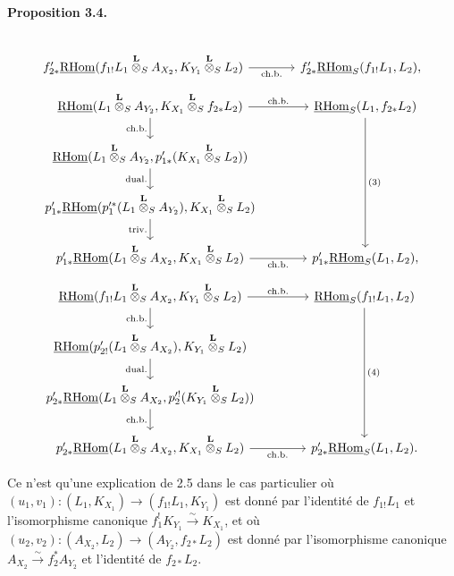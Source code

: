 \documentclass[11pt]{article}
\newenvironment{statement}[1]{\par\medskip\noindent\textbf{#1.}\ }{\par\medskip}
\newcommand{\R}{\mathrm{R}}\newcommand{\RHomCore}{\mathrm{RHom}}
\providecommand{\RHom}{\RHomCore}
\providecommand{\uRHom}{\underline{\RHom}}
\providecommand{\RHom}{\RHomCore}
\providecommand{\RHom}{\R\mathcal{H}om}
\providecommand{\R}{\mathrm R}
\providecommand{\RHom}{\RHomCore}
\begin{document}
\begin{statement}{Proposition 3.4}
\[\begin{tikzcd}[column sep=3.7em,row sep=1.7em]
& \\
f'_{2*}\uRHom(f_{1!}L_1\overset{\mathbf L}{\otimes}_S A_{X_2},K_{Y_1}\overset{\mathbf L}{\otimes}_S L_2) \arrow[r,"\mathrm{ch.b.}"']
& f'_{2*}\uRHom_S(f_{1!}L_1,L_2),
\end{tikzcd}
\]
\[
\begin{tikzcd}[column sep=3.7em,row sep=1.7em]
\uRHom(L_1\overset{\mathbf L}{\otimes}_S A_{Y_2},K_{X_1}\overset{\mathbf L}{\otimes}_S f_{2*}L_2)
  \arrow[r,"\mathrm{ch.b.}"] \arrow[d,"\mathrm{ch.b.}"']
& \uRHom_S(L_1,f_{2*}L_2) \arrow[ddd,"(3)"] \\
\uRHom(L_1\overset{\mathbf L}{\otimes}_S A_{Y_2},p'_{1*}(K_{X_1}\overset{\mathbf L}{\otimes}_S L_2)) \arrow[d,"\mathrm{dual.}"']
& \\
p'_{1*}\uRHom(p_1'^*(L_1\overset{\mathbf L}{\otimes}_S A_{Y_2}),K_{X_1}\overset{\mathbf L}{\otimes}_S L_2) \arrow[d,"\mathrm{triv.}"']
& \\
p'_{1*}\uRHom(L_1\overset{\mathbf L}{\otimes}_S A_{X_2},K_{X_1}\overset{\mathbf L}{\otimes}_S L_2) \arrow[r,"\mathrm{ch.b.}"']
& p'_{1*}\uRHom_S(L_1,L_2),
\end{tikzcd}
\]
\[
\begin{tikzcd}[column sep=3.7em,row sep=1.7em]
\uRHom(f_{1!}L_1\overset{\mathbf L}{\otimes}_S A_{X_2},K_{Y_1}\overset{\mathbf L}{\otimes}_S L_2)
  \arrow[r,"\mathrm{ch.b.}"] \arrow[d,"\mathrm{ch.b.}"']
& \uRHom_S(f_{1!}L_1,L_2) \arrow[ddd,"(4)"] \\
\uRHom(p'_{2!}(L_1\overset{\mathbf L}{\otimes}_S A_{X_2}),K_{Y_1}\overset{\mathbf L}{\otimes}_S L_2) \arrow[d,"\mathrm{dual.}"']
& \\
p'_{2*}\uRHom(L_1\overset{\mathbf L}{\otimes}_S A_{X_2},p_2'^!(K_{Y_1}\overset{\mathbf L}{\otimes}_S L_2)) \arrow[d,"\mathrm{ch.b.}"']
& \\
p'_{2*}\uRHom(L_1\overset{\mathbf L}{\otimes}_S A_{X_2},K_{X_1}\overset{\mathbf L}{\otimes}_S L_2) \arrow[r,"\mathrm{ch.b.}"']
& p'_{2*}\uRHom_S(L_1,L_2).
\end{tikzcd}
\]
\end{statement}
Ce n'est qu'une explication de 2.5 dans le cas particulier où $(u_1,v_1):(L_1,K_{X_1})\to(f_{1!}L_1,K_{Y_1})$ est donné par l'identité de $f_{1!}L_1$ et l'isomorphisme canonique $f_1^!K_{Y_1}\xrightarrow{\sim}K_{X_1}$, et où $(u_2,v_2):(A_{X_2},L_2)\to(A_{Y_2},f_{2*}L_2)$ est donné par l'isomorphisme canonique $A_{X_2}\xrightarrow{\sim}f_2^*A_{Y_2}$ et l'identité de $f_{2*}L_2$.
\end{document}
